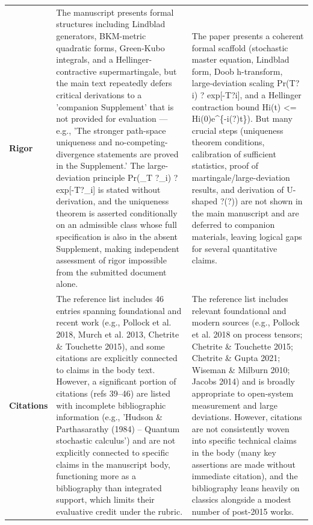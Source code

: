 \documentclass[11pt]{article}
\begin{document}
\begin{longtable}{@{} p{2.2cm} p{6.3cm} p{6.3cm} @{}}
\rowcolor{rowgray}
\textbf{Rigor} &
The manuscript presents formal structures including Lindblad generators, BKM-metric quadratic forms, Green-Kubo integrals, and a Hellinger-contractive supermartingale, but the main text repeatedly defers critical derivations to a 'companion Supplement' that is not provided for evaluation --- e.g., 'The stronger path-space uniqueness and no-competing-divergence statements are proved in the Supplement.' The large-deviation principle Pr(\textrho{}\_T \textrightarrow{} ?\_i) ? exp[-T?\_i] is stated without derivation, and the uniqueness theorem is asserted conditionally on an admissible class whose full specification is also in the absent Supplement, making independent assessment of rigor impossible from the submitted document alone. &
The paper presents a coherent formal scaffold (stochastic master equation, Lindblad form, Doob h-transform, large-deviation scaling Pr(\textrho{}T\textrightarrow{}?i) ? exp[-T?i], and a Hellinger contraction bound Hi(t) \textless{}= Hi(0)e\textasciicircum{}\{-\textgamma{}i(?)t\}). But many crucial steps (uniqueness theorem conditions, calibration of sufficient statistics, proof of martingale/large-deviation results, and derivation of U-shaped ?(?)) are not shown in the main manuscript and are deferred to companion materials, leaving logical gaps for several quantitative claims. \\[6pt]

\textbf{Citations} &
The reference list includes 46 entries spanning foundational and recent work (e.g., Pollock et al. 2018, Murch et al. 2013, Chetrite \& Touchette 2015), and some citations are explicitly connected to claims in the body text. However, a significant portion of citations (refs 39--46) are listed with incomplete bibliographic information (e.g., 'Hudson \& Parthasarathy (1984) -- Quantum stochastic calculus') and are not explicitly connected to specific claims in the manuscript body, functioning more as a bibliography than integrated support, which limits their evaluative credit under the rubric. &
The reference list includes relevant foundational and modern sources (e.g., Pollock et al. 2018 on process tensors; Chetrite \& Touchette 2015; Chetrite \& Gupta 2021; Wiseman \& Milburn 2010; Jacobs 2014) and is broadly appropriate to open-system measurement and large deviations. However, citations are not consistently woven into specific technical claims in the body (many key assertions are made without immediate citation), and the bibliography leans heavily on classics alongside a modest number of post-2015 works. \\

\end{longtable}
\end{document}

